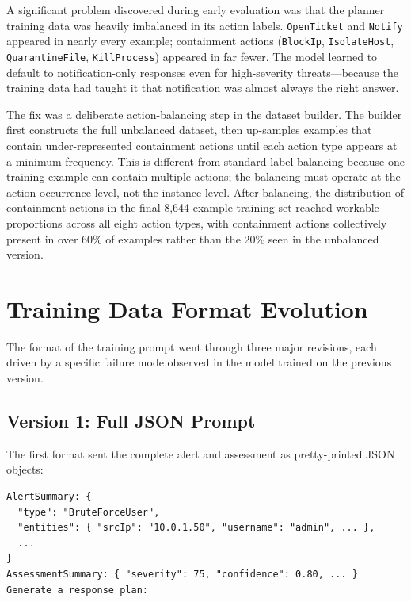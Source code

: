 A significant problem discovered during early evaluation was that the planner training data was heavily imbalanced in its action labels. \texttt{OpenTicket} and \texttt{Notify} appeared in nearly every example; containment actions (\texttt{BlockIp}, \texttt{IsolateHost}, \texttt{QuarantineFile}, \texttt{KillProcess}) appeared in far fewer. The model learned to default to notification-only responses even for high-severity threats---because the training data had taught it that notification was almost always the right answer.

The fix was a deliberate action-balancing step in the dataset builder. The builder first constructs the full unbalanced dataset, then up-samples examples that contain under-represented containment actions until each action type appears at a minimum frequency. This is different from standard label balancing because one training example can contain multiple actions; the balancing must operate at the action-occurrence level, not the instance level. After balancing, the distribution of containment actions in the final 8,644-example training set reached workable proportions across all eight action types, with containment actions collectively present in over 60\% of examples rather than the 20\% seen in the unbalanced version.

\section{Training Data Format Evolution}
\label{sec:format-evolution}

The format of the training prompt went through three major revisions, each driven by a specific failure mode observed in the model trained on the previous version.

\subsection{Version 1: Full JSON Prompt}

The first format sent the complete alert and assessment as pretty-printed JSON objects:

\begin{verbatim}
AlertSummary: {
  "type": "BruteForceUser",
  "entities": { "srcIp": "10.0.1.50", "username": "admin", ... },
  ...
}
AssessmentSummary: { "severity": 75, "confidence": 0.80, ... }
Generate a response plan:
\end{verbatim}

